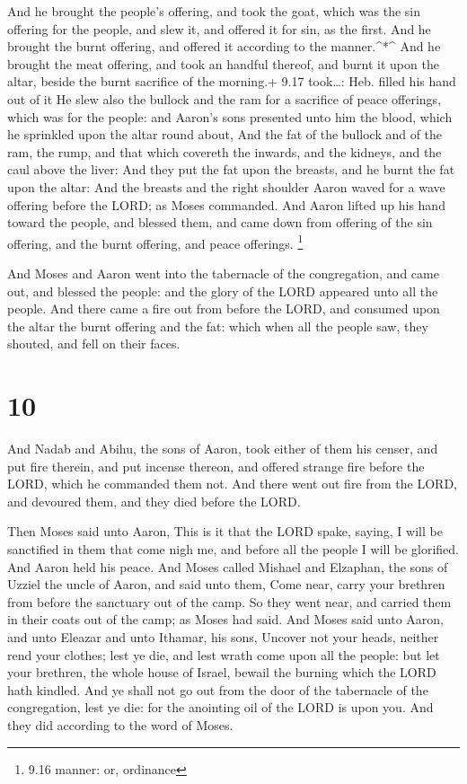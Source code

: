  And he brought the people's offering, and took the goat,
which was the sin offering for the people, and slew it, and offered it
for sin, as the first.  And he brought the burnt offering,
and offered it according to the manner.\^{}*\^{}  And he
brought the meat offering, and took an handful thereof, and burnt it
upon the altar, beside the burnt sacrifice of the morning.+ 9.17
took\ldots: Heb. filled his hand out of it  He slew also
the bullock and the ram for a sacrifice of peace offerings, which was
for the people: and Aaron's sons presented unto him the blood, which he
sprinkled upon the altar round about,  And the fat of the
bullock and of the ram, the rump, and that which covereth the inwards,
and the kidneys, and the caul above the liver:  And they
put the fat upon the breasts, and he burnt the fat upon the altar:
 And the breasts and the right shoulder Aaron waved for a
wave offering before the LORD; as Moses commanded.  And
Aaron lifted up his hand toward the people, and blessed them, and came
down from offering of the sin offering, and the burnt offering, and
peace offerings. \footnote{9.16 manner: or, ordinance}

 And Moses and Aaron went into the tabernacle of the
congregation, and came out, and blessed the people: and the glory of the
LORD appeared unto all the people.  And there came a fire
out from before the LORD, and consumed upon the altar the burnt offering
and the fat: which when all the people saw, they shouted, and fell on
their faces.

\hypertarget{section-9}{%
\section{10}\label{section-9}}

 And Nadab and Abihu, the sons of Aaron, took either of them
his censer, and put fire therein, and put incense thereon, and offered
strange fire before the LORD, which he commanded them not. 
And there went out fire from the LORD, and devoured them, and they died
before the LORD.

 Then Moses said unto Aaron, This is it that the LORD spake,
saying, I will be sanctified in them that come nigh me, and before all
the people I will be glorified. And Aaron held his peace. 
And Moses called Mishael and Elzaphan, the sons of Uzziel the uncle of
Aaron, and said unto them, Come near, carry your brethren from before
the sanctuary out of the camp.  So they went near, and
carried them in their coats out of the camp; as Moses had said.
 And Moses said unto Aaron, and unto Eleazar and unto
Ithamar, his sons, Uncover not your heads, neither rend your clothes;
lest ye die, and lest wrath come upon all the people: but let your
brethren, the whole house of Israel, bewail the burning which the LORD
hath kindled.  And ye shall not go out from the door of the
tabernacle of the congregation, lest ye die: for the anointing oil of
the LORD is upon you. And they did according to the word of Moses.

